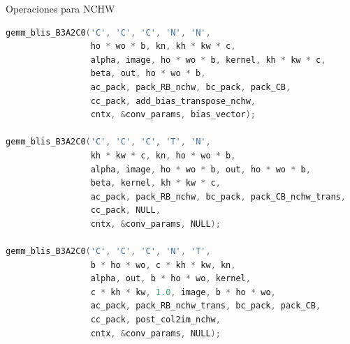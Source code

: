 \documentclass[aspectratio=43]{beamer}
\newcommand{\subsectiontoc}[1]{
    \subsection{#1}
    \begin{frame}%
    \tableofcontents[currentsubsection]
    \end{frame}
}
\begin{document}
\begin{frame}[fragile]{Operaciones para NCHW}
\begin{lstlisting}[language=C,basicstyle=\scriptsize\ttfamily]
gemm_blis_B3A2C0('C', 'C', 'C', 'N', 'N',
                 ho * wo * b, kn, kh * kw * c,
                 alpha, image, ho * wo * b, kernel, kh * kw * c,
                 beta, out, ho * wo * b,
                 ac_pack, pack_RB_nchw, bc_pack, pack_CB,
                 cc_pack, add_bias_transpose_nchw,
                 cntx, &conv_params, bias_vector);

gemm_blis_B3A2C0('C', 'C', 'C', 'T', 'N',
                 kh * kw * c, kn, ho * wo * b,
                 alpha, image, ho * wo * b, out, ho * wo * b,
                 beta, kernel, kh * kw * c,
                 ac_pack, pack_RB_nchw, bc_pack, pack_CB_nchw_trans,
                 cc_pack, NULL,
                 cntx, &conv_params, NULL);

gemm_blis_B3A2C0('C', 'C', 'C', 'N', 'T',
                 b * ho * wo, c * kh * kw, kn,
                 alpha, out, b * ho * wo, kernel,
                 c * kh * kw, 1.0, image, b * ho * wo,
                 ac_pack, pack_RB_nchw_trans, bc_pack, pack_CB,
                 cc_pack, post_col2im_nchw,
                 cntx, &conv_params, NULL);
\end{lstlisting}
\end{frame}


\begin{frame}%
\end{frame}

\begin{frame}%
\end{frame}

\begin{frame}%
\end{frame}
\end{document}
